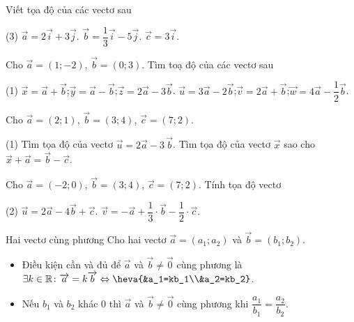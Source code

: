 \begin{vd}
	Viết tọa độ của các vectơ sau
	\begin{tasks}(3)
		\task $\overrightarrow{a}=2\overrightarrow{i}+3\overrightarrow{j}$.
		\task $\overrightarrow{b}=\dfrac{1}{3}\overrightarrow{i}-5\overrightarrow{j}$.
		\task $\overrightarrow{c}=3\overrightarrow{i}$.
	\end{tasks}
\end{vd}
\begin{vd}
	Cho $\overrightarrow{a}=(1;-2)$, $\overrightarrow{b}=(0;3)$. Tìm toạ độ của các vectơ sau
	\begin{tasks}(1)
		\task $\overrightarrow{x}=\overrightarrow{a}+\overrightarrow{b}$;\quad $\overrightarrow{y}=\overrightarrow{a}-\overrightarrow{b}$;\quad $\overrightarrow{z}=2\overrightarrow{a}-3\overrightarrow{b}$.
		\task $\overrightarrow{u}=3\overrightarrow{a}-2\overrightarrow{b}$;\quad $\overrightarrow{v}=2\overrightarrow{a}+\overrightarrow{b}$;\quad $\overrightarrow{w}=4\overrightarrow{a}-\dfrac{1}{2}\overrightarrow{b}$.
	\end{tasks}
\end{vd}

\begin{vd}
	Cho $\overrightarrow{a}=(2;1)$, $\overrightarrow{b}=(3;4)$, $\overrightarrow{c}=(7;2)$.
	\begin{tasks}(1)
		\task Tìm tọa độ của vectơ $\overrightarrow{u}=2\overrightarrow{a}-3\,\overrightarrow{b}$.
		\task Tìm tọa độ của vectơ $\overrightarrow{x}$ sao cho $\overrightarrow{x}+\overrightarrow{a}=\overrightarrow{b}-\overrightarrow{c}$.
	\end{tasks}
\end{vd}

\begin{vd}
	Cho $\overrightarrow{a}=(-2;0)$, $\overrightarrow{b}=(3;4)$, $\overrightarrow{c}=(7;2)$. Tính tọa độ vectơ
	\begin{tasks}(2)
		\task  $\overrightarrow{u}=2\overrightarrow{a}-4\overrightarrow{b}+\overrightarrow{c}$.
		\task $\overrightarrow{v}=-\overrightarrow{a}+\dfrac{1}{3}\cdot\overrightarrow{b}-\dfrac{1}{2}\cdot\overrightarrow{c}$.
	\end{tasks}
\end{vd}

\begin{dang}{Hai vectơ cùng phương}
	 Cho hai vectơ $\overrightarrow{a}=\left( a_1;a_2 \right)$ và $\overrightarrow{b}=\left( b_1;b_2\right)$.  
	 \begin{itemize}
	 	\item [\iconMT] Điều kiện cần và đủ để $\overrightarrow{a}$ và $\overrightarrow{b} \ne \overrightarrow{0}$ cùng phương là $\exists k \in \mathbb{R} \colon \overrightarrow{a}=k\overrightarrow{b} \Leftrightarrow \heva{&a_1=kb_1\\&a_2=kb_2}$.
	 	\item [\iconMT] Nếu $b_1$ và $b_2$ khác $0$ thì $\overrightarrow{a}$ và $\overrightarrow{b} \ne \overrightarrow{0}$ cùng phương khi  $\dfrac{a_1}{b_1}=\dfrac{a_2}{b_2}$.
	 
	 \end{itemize}
\end{dang}

